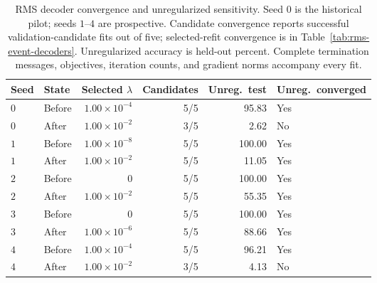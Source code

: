 \begin{table}[htbp]
\centering\small
\setlength{\tabcolsep}{4pt}
\caption{RMS decoder convergence and unregularized sensitivity. Seed $0$ is the historical pilot; seeds $1$--$4$ are prospective. Candidate convergence reports successful validation-candidate fits out of five; selected-refit convergence is in Table~\ref{tab:rms-event-decoders}. Unregularized accuracy is held-out percent. Complete termination messages, objectives, iteration counts, and gradient norms accompany every fit.}
\label{tab:rms-decoder-diagnostics}
\begin{tabular}{llrrrl}
\toprule
Seed & State & Selected $\lambda$ & Candidates & Unreg.\ test & Unreg.\ converged \\
\midrule
$0$ & Before & $1.00\times10^{-4}$ & 5/5 & 95.83 & Yes \\
$0$ & After & $1.00\times10^{-2}$ & 3/5 & 2.62 & No \\
$1$ & Before & $1.00\times10^{-8}$ & 5/5 & 100.00 & Yes \\
$1$ & After & $1.00\times10^{-2}$ & 5/5 & 11.05 & Yes \\
$2$ & Before & $0$ & 5/5 & 100.00 & Yes \\
$2$ & After & $1.00\times10^{-2}$ & 5/5 & 55.35 & Yes \\
$3$ & Before & $0$ & 5/5 & 100.00 & Yes \\
$3$ & After & $1.00\times10^{-6}$ & 5/5 & 88.66 & Yes \\
$4$ & Before & $1.00\times10^{-4}$ & 5/5 & 96.21 & Yes \\
$4$ & After & $1.00\times10^{-2}$ & 3/5 & 4.13 & No \\
\bottomrule
\end{tabular}
\end{table}

